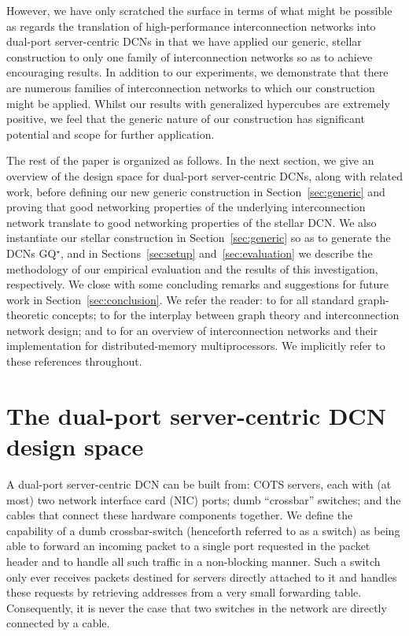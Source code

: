 \documentclass[]{amsart}
\begin{document}
However, we have only scratched the surface in terms of what might be possible as regards the translation of high-performance interconnection networks into dual-port server-centric DCNs in that we have applied our generic, stellar construction to only one family of interconnection networks so as to achieve encouraging results. In addition to our experiments, we demonstrate that there are numerous families of interconnection networks to which our construction might be applied. Whilst our results with generalized hypercubes are extremely positive, we feel that the generic nature of our construction has significant potential and scope for further application.

The rest of the paper is organized as follows.  In the next section,
we give an overview of the design space for dual-port server-centric
DCNs, along with related work, before defining our new generic construction
in Section~\ref{sec:generic} and proving that good networking properties of the underlying interconnection network translate to good networking properties of the stellar DCN.  We also instantiate our stellar construction in Section~\ref{sec:generic} so
as to generate the DCNs GQ$^\star$, and in Sections~\ref{sec:setup} and~\ref{sec:evaluation} we describe the methodology of our empirical evaluation and
the results of this investigation, respectively.  We close with some concluding remarks and
suggestions for future work in Section~\ref{sec:conclusion}. We refer the reader: to \cite{Diestel2012} for all standard graph-theoretic concepts; to \cite{HsuLin2009,Xu2010} for the interplay between graph theory and interconnection network design; and to \cite{DallyTowles2003} for an overview of interconnection networks and their implementation for distributed-memory multiprocessors. We implicitly refer to these references throughout.









\section{The dual-port server-centric DCN design space}
\label{sec:preliminaries}


A dual-port server-centric DCN can be built from: COTS servers, each with (at most) two network interface card (NIC) ports; dumb
``crossbar'' switches; and the cables that connect these hardware
components together.  We define the capability of a dumb crossbar-switch (henceforth referred to as a switch) as being able to forward an incoming packet to a single port requested in the packet header and to handle all such traffic in a non-blocking manner.  Such a switch only ever receives packets destined for servers directly attached to it and handles these requests by retrieving addresses from a very small forwarding table.  Consequently, it is never the case that two switches in the network are directly connected by a cable.  
\end{document}
